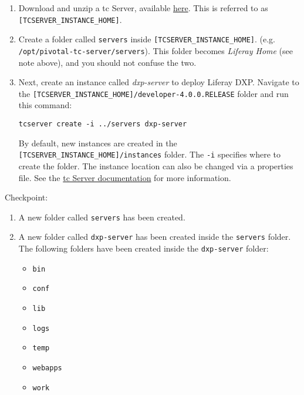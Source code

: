 \begin{enumerate}
\def\labelenumi{\arabic{enumi}.}
\item
  Download and unzip a tc Server, available
  \href{https://network.pivotal.io/products/pivotal-tcserver}{here}.
  This is referred to as \texttt{{[}TCSERVER\_INSTANCE\_HOME{]}}.
\item
  Create a folder called \texttt{servers} inside
  \texttt{{[}TCSERVER\_INSTANCE\_HOME{]}}. (e.g.~
  \texttt{/opt/pivotal-tc-server/servers}). This folder becomes
  \emph{Liferay Home} (see note above), and you should not confuse the
  two.
\item
  Next, create an instance called \emph{dxp-server} to deploy Liferay
  DXP. Navigate to the
  \texttt{{[}TCSERVER\_INSTANCE\_HOME{]}/developer-4.0.0.RELEASE} folder
  and run this command:

\begin{verbatim}
tcserver create -i ../servers dxp-server
\end{verbatim}

  By default, new instances are created in the
  \texttt{{[}TCSERVER\_INSTANCE\_HOME{]}/instances} folder. The
  \texttt{-i} specifies where to create the folder. The instance
  location can also be changed via a properties file. See the
  \href{https://tcserver.docs.pivotal.io/4x/docs-tcserver/topics/tcserver-properties-reference.html}{tc
  Server documentation} for more information.
\end{enumerate}

Checkpoint:

\begin{enumerate}
\def\labelenumi{\arabic{enumi}.}
\item
  A new folder called \texttt{servers} has been created.
\item
  A new folder called \texttt{dxp-server} has been created inside the
  \texttt{servers} folder. The following folders have been created
  inside the \texttt{dxp-server} folder:

  \begin{itemize}
  \tightlist
  \item
    \texttt{bin}
  \item
    \texttt{conf}
  \item
    \texttt{lib}
  \item
    \texttt{logs}
  \item
    \texttt{temp}
  \item
    \texttt{webapps}
  \item
    \texttt{work}
  \end{itemize}
\end{enumerate}

